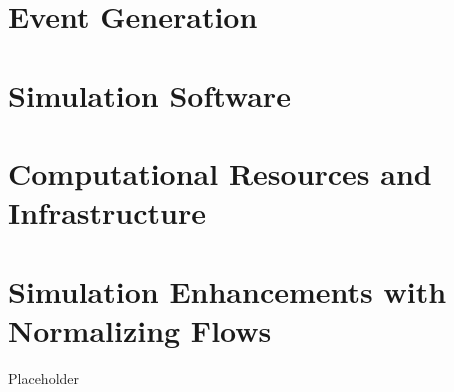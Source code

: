 \iffalse
Approaching through the lens of an inverse problem, we use existing knowledge to create event generators that produce reasonable the underlying physics processes. These computer generated datasets are then swam through microphysics simulations of the CLAS12 experiment on an event by event basis to produce a simulated dataset. By comparing the experimental data to the simulated data, and the simulated data to the model of the underlying distribution, inferences can be made about the true underlying distribution generating the experimental data. 
\todo{Fix this stupidly phrased section}
\fi


\section{Event Generation}\label{sec:ch3generator}
    
\clearpage

\section{Simulation Software}\label{sec:sim_pipeline}
 


\section{Computational Resources and Infrastructure}\label{sec:comp_infrastructure}
   
    



    

\clearpage

\section{Simulation Enhancements with Normalizing Flows}\label{sec:normflow}
    Placeholder
    




